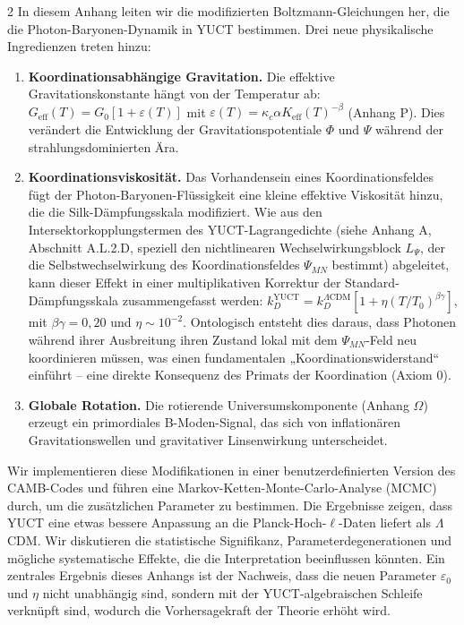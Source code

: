 \documentclass[11pt,a4paper]{article}
\begin{document}
\begin{multicols}{2}
		In diesem Anhang leiten wir die modifizierten Boltzmann-Gleichungen her, die die Photon-Baryonen-Dynamik in YUCT bestimmen. Drei neue physikalische Ingredienzen treten hinzu:
		\begin{enumerate}
			\item \textbf{Koordinationsabhängige Gravitation.} Die effektive Gravitationskonstante hängt von der Temperatur ab: $G_{\mathrm{eff}}(T) = G_0[1 + \varepsilon(T)]$ mit $\varepsilon(T) = \kappa_c \alpha K_{\mathrm{eff}}(T)^{-\beta}$ (Anhang P). Dies verändert die Entwicklung der Gravitationspotentiale $\Phi$ und $\Psi$ während der strahlungsdominierten Ära.
			\item \textbf{Koordinationsviskosität.} Das Vorhandensein eines Koordinationsfeldes fügt der Photon-Baryonen-Flüssigkeit eine kleine effektive Viskosität hinzu, die die Silk-Dämpfungsskala modifiziert. Wie aus den Intersektorkopplungstermen des YUCT-Lagrangedichte (siehe Anhang A, Abschnitt A.L.2.D, speziell den nichtlinearen Wechselwirkungsblock $L_{\Psi}$, der die Selbstwechselwirkung des Koordinationsfeldes $\Psi_{MN}$ bestimmt) abgeleitet, kann dieser Effekt in einer multiplikativen Korrektur der Standard-Dämpfungsskala zusammengefasst werden: $k_D^{\text{YUCT}} = k_D^{\Lambda\text{CDM}} [1 + \eta (T/T_0)^{\beta\gamma}]$, mit $\beta\gamma = 0,20$ und $\eta \sim 10^{-2}$. Ontologisch entsteht dies daraus, dass Photonen während ihrer Ausbreitung ihren Zustand lokal mit dem $\Psi_{MN}$-Feld neu koordinieren müssen, was einen fundamentalen „Koordinationswiderstand“ einführt – eine direkte Konsequenz des Primats der Koordination (Axiom 0).
			\item \textbf{Globale Rotation.} Die rotierende Universumskomponente (Anhang $\Omega$) erzeugt ein primordiales B-Moden-Signal, das sich von inflationären Gravitationswellen und gravitativer Linsenwirkung unterscheidet.
		\end{enumerate}
		
		Wir implementieren diese Modifikationen in einer benutzerdefinierten Version des CAMB-Codes und führen eine Markov-Ketten-Monte-Carlo-Analyse (MCMC) durch, um die zusätzlichen Parameter zu bestimmen. Die Ergebnisse zeigen, dass YUCT eine etwas bessere Anpassung an die Planck-Hoch-$\ell$-Daten liefert als $\Lambda$CDM. Wir diskutieren die statistische Signifikanz, Parameterdegenerationen und mögliche systematische Effekte, die die Interpretation beeinflussen könnten. Ein zentrales Ergebnis dieses Anhangs ist der Nachweis, dass die neuen Parameter $\varepsilon_0$ und $\eta$ nicht unabhängig sind, sondern mit der YUCT-algebraischen Schleife verknüpft sind, wodurch die Vorhersagekraft der Theorie erhöht wird.
		

\end{multicols}
\end{document}
